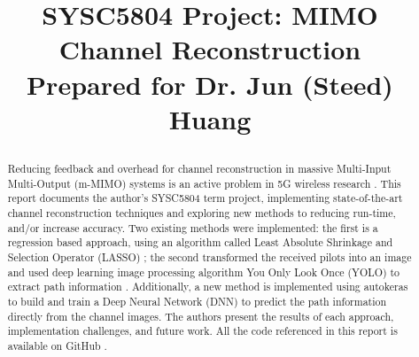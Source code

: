 \documentclass[conference, compsoc, onecolumn]{IEEEtran}
\begin{document}
\renewcommand\thesection{\arabic{section}}
\newcommand\norm[1]{\left\lVert#1\right\rVert}

\graphicspath{ {./figures/} }

\title{SYSC5804 Project: MIMO Channel Reconstruction\\
{\footnotesize Prepared for Dr. Jun (Steed) Huang}

}

\author{
\and
{}
}

\maketitle

\begin{abstract}
Reducing feedback and overhead for channel reconstruction in massive Multi-Input Multi-Output (m-MIMO) systems is an active problem in 5G wireless research \cite{Ye2018}. This report documents the author's SYSC5804 term project, implementing state-of-the-art channel reconstruction techniques and exploring new methods to reducing run-time, and/or increase accuracy. Two existing methods were implemented: the first is a regression based approach, using an algorithm called Least Absolute  Shrinkage  and  Selection  Operator (LASSO) \cite{Han2019}; the second transformed the received pilots into an image and used deep learning image processing algorithm You Only Look Once (YOLO) to extract path information \cite{Li2020}. Additionally, a new method is implemented using autokeras \cite{jin2019} to build and train a Deep Neural Network (DNN) to predict the path information directly from the channel images. The authors present the results of each approach, implementation challenges, and future work. All the code referenced in this report is available on GitHub \cite{git}.

\end{abstract}
\end{document}
